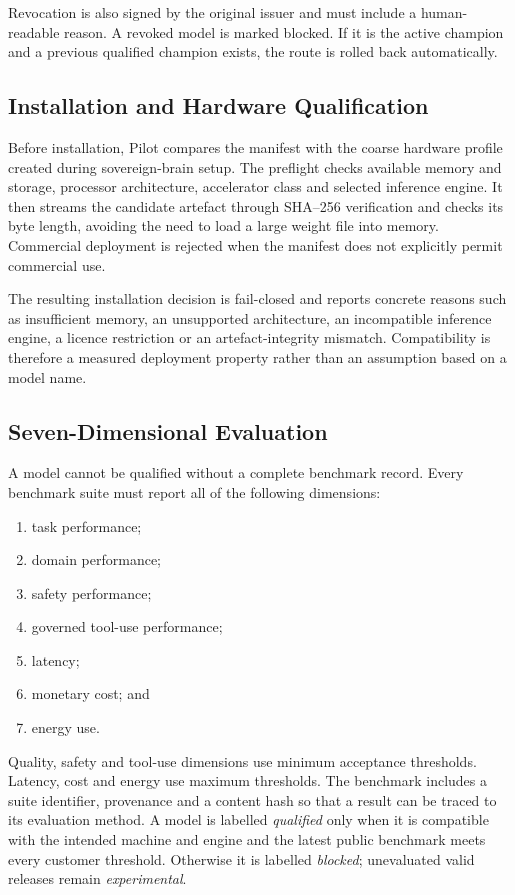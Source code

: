 Revocation is also signed by the original issuer and must include a human-readable
reason.  A revoked model is marked blocked.  If it is the active champion and a previous
qualified champion exists, the route is rolled back automatically.

\subsection{Installation and Hardware Qualification}

Before installation, Pilot compares the manifest with the coarse hardware profile
created during sovereign-brain setup.  The preflight checks available memory and storage,
processor architecture, accelerator class and selected inference engine.  It then streams
the candidate artefact through SHA--256 verification and checks its byte length, avoiding
the need to load a large weight file into memory.  Commercial deployment is rejected when
the manifest does not explicitly permit commercial use.

The resulting installation decision is fail-closed and reports concrete reasons such as
insufficient memory, an unsupported architecture, an incompatible inference engine, a
licence restriction or an artefact-integrity mismatch.  Compatibility is therefore a
measured deployment property rather than an assumption based on a model name.

\subsection{Seven-Dimensional Evaluation}

A model cannot be qualified without a complete benchmark record.  Every benchmark suite
must report all of the following dimensions:
\begin{enumerate}
  \item task performance;
  \item domain performance;
  \item safety performance;
  \item governed tool-use performance;
  \item latency;
  \item monetary cost; and
  \item energy use.
\end{enumerate}

Quality, safety and tool-use dimensions use minimum acceptance thresholds.  Latency,
cost and energy use maximum thresholds.  The benchmark includes a suite identifier,
provenance and a content hash so that a result can be traced to its evaluation method.
A model is labelled \emph{qualified} only when it is compatible with the intended machine
and engine and the latest public benchmark meets every customer threshold.  Otherwise it
is labelled \emph{blocked}; unevaluated valid releases remain \emph{experimental}.

